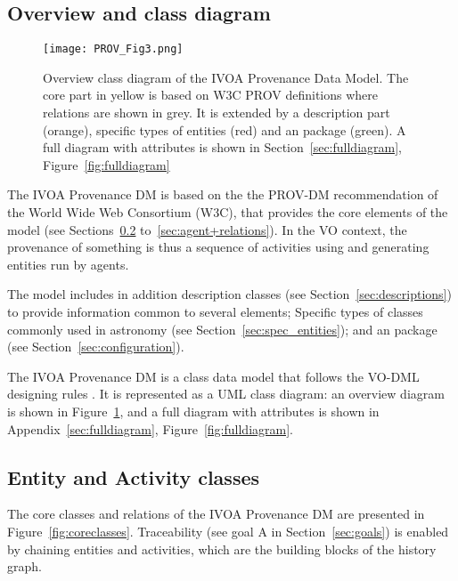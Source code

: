 
\subsection{Overview and class diagram}
\label{sec:overview}


\begin{figure}[hbt]
\centering
\texttt{[image: PROV\_Fig3.png]}
\caption[Overview class diagram of the IVOA Provenance Data Model]{Overview class diagram of the IVOA Provenance Data Model. The core part in yellow is based on W3C PROV definitions where relations are shown in grey. It is extended by a description part (orange), specific types of entities (red) and an  package (green). A full diagram with attributes is shown in Section~\ref{sec:fulldiagram}, Figure~\ref{fig:fulldiagram}}
\label{fig:overview}
\end{figure}

The IVOA Provenance DM is based on the the PROV-DM recommendation \citep{std:W3CProvDM} of the World Wide Web Consortium (W3C), that provides the core elements of the model (see Sections~\ref{sec:ent_act} to~\ref{sec:agent+relations}). 
In the VO context, the provenance of something is thus a sequence of activities using and generating entities run by agents.

The model includes in addition description classes (see Section~\ref{sec:descriptions}) to provide information common to several elements; Specific types of  classes commonly used in astronomy (see Section~\ref{sec:spec_entities}); and an  package (see Section~\ref{sec:configuration}).

The IVOA Provenance DM is a class data model that follows the VO-DML designing rules \citep{2018ivoa.spec.0910L}. It is represented as a UML class diagram: an overview diagram is shown in Figure~\ref{fig:overview}, and a full diagram with attributes is shown in Appendix~\ref{sec:fulldiagram}, Figure~\ref{fig:fulldiagram}.


\subsection{Entity and Activity classes}
\label{sec:ent_act}

The core classes and relations of the IVOA Provenance DM are presented in Figure~\ref{fig:coreclasses}.
Traceability (see goal A in Section~\ref{sec:goals}) is enabled by chaining entities and activities, which are the building blocks of the history graph.


